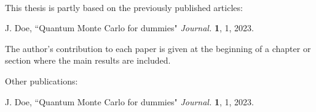 
 \\

This thesis is partly based on the previously published articles:

\begin{enumerate}[label={[\arabic*]}]
\item J. Doe, ``Quantum Monte Carlo for dummies" \textit{Journal.} \textbf{1}, 1, 2023.
\end{enumerate}

The author's contribution to each paper is given at the beginning of a chapter or section where the main results are included. 

Other publications:

\begin{enumerate}[label={[\arabic*]}]
\item J. Doe, ``Quantum Monte Carlo for dummies" \textit{Journal.} \textbf{1}, 1, 2023.
\end{enumerate}

